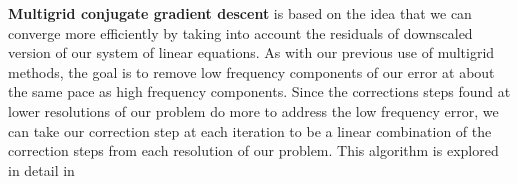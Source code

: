 \textbf{Multigrid conjugate gradient descent} is based on the idea that we can converge more efficiently by taking into account the residuals of downscaled version of our system of linear equations. As with our previous use of multigrid methods, the goal is to remove low frequency components of our error at about the same pace as high frequency components. Since the corrections steps found at lower resolutions of our problem do more to address the low frequency error, we can take our correction step at each iteration to be a linear combination of the correction steps from each resolution of our problem. This algorithm is explored in detail in \cite{pflaum08}
